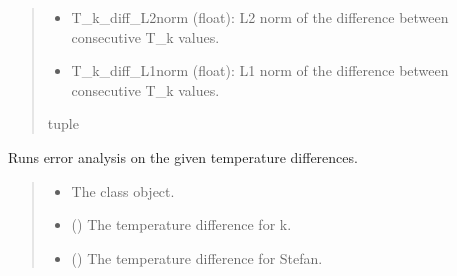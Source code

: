 \documentclass[a4paper,11pt,english,openany]{sphinxmanual}
\begin{document}
\begin{fulllineitems}
\begin{fulllineitems}
\begin{quote}
\begin{description}
\begin{description}
\begin{itemize}
\item {} 
\sphinxAtStartPar
T\_k\_diff\_L2norm (float): L2 norm of the difference between consecutive T\_k values.

\item {} 
\sphinxAtStartPar
T\_k\_diff\_L1norm (float): L1 norm of the difference between consecutive T\_k values.

\end{itemize}

\end{description}


\sphinxAtStartPar
tuple

\end{description}\end{quote}

\end{fulllineitems}


\begin{fulllineitems}
\label{\detokenize{api/spyice.postprocess.analysis:spyice.postprocess.analysis.Analysis.get_error_results}}
\pysigstartsignatures
{}
\pysigstopsignatures
\sphinxAtStartPar
Runs error analysis on the given temperature differences.
\begin{quote}\begin{description}
\begin{itemize}
\item {} 
\sphinxAtStartPar
{} \textendash{} The class object.

\item {} 
\sphinxAtStartPar
{} () \textendash{} The temperature difference for k.

\item {} 
\sphinxAtStartPar
{} () \textendash{} The temperature difference for Stefan.


\end{itemize}
\end{description}
\end{quote}
\end{fulllineitems}
\end{fulllineitems}
\end{document}
